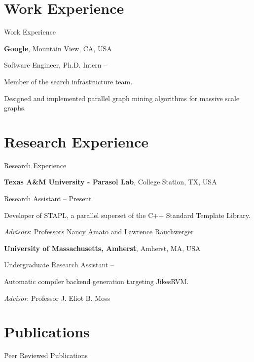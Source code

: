 \documentclass[a4paper,10pt,oneside]{article}
\begin{document}
\begin{body}
\section{Work Experience}
{Work Experience}

\textbf{Google},
Mountain View, CA, USA
\par
Software Engineer, Ph.D. Intern
\hfill
{} --
\begin{detail}
Member of the search infrastructure team.
\par
 Designed and implemented parallel graph mining algorithms for massive scale graphs.
 \par
\end{detail}



\section{Research Experience}
{Research Experience}

\textbf{Texas A\&M University - Parasol Lab}, College Station, TX, USA
\par
Research Assistant
\hfill
{} --
Present
\begin{detail}
Developer of STAPL, a parallel superset of the C++ Standard Template Library.
\par
\emph{Advisors}: Professors Nancy Amato and Lawrence Rauchwerger
\par
\end{detail}
\EntryGap

\textbf{University of Massachusetts, Amherst}, Amherst, MA, USA
\par
Undergraduate Research Assistant
\hfill
{} --
\begin{detail}
Automatic compiler backend generation targeting JikesRVM.
\par
\emph{Advisor}: Professor J. Eliot B. Moss
\par
\end{detail}



\section{Publications}
{Peer Reviewed Publications}


\end{body}
\end{document}

